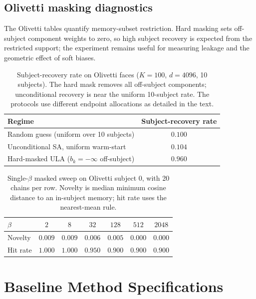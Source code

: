\subsection{Olivetti masking diagnostics}
The Olivetti tables quantify memory-subset restriction. Hard masking
sets off-subject component weights to zero, so high subject recovery is expected
from the restricted support; the experiment remains useful for measuring
leakage and the geometric effect of soft biases.
\begin{table}[ht]
\centering
\caption{Subject-recovery rate on Olivetti faces ($K=100$,
$d=4096$, 10 subjects). The hard mask removes all off-subject components;
unconditional recovery is near the uniform 10-subject rate. The protocols use
different endpoint allocations as detailed in the text.}
\label{tab:olivetti-recovery}
\small
\begin{tabular}{@{}lc@{}}
\toprule
Regime & Subject-recovery rate \\
\midrule
Random guess (uniform over 10 subjects) & $0.100$ \\
Unconditional SA, uniform warm-start    & $0.104$ \\
Hard-masked ULA ($b_{k}{=}-\infty$ off-subject) & $0.960$ \\
\bottomrule
\end{tabular}
\end{table}

\begin{table}[ht]
\centering
\caption{Single-$\beta$ masked sweep on Olivetti subject 0, with
20 chains per row. Novelty is median minimum cosine distance to an in-subject
memory; hit rate uses the nearest-mean rule.}
\label{tab:olivetti-betasweep}
\small
\begin{tabular}{@{}lcccccc@{}}
\toprule
$\beta$ & $2$ & $8$ & $32$ & $128$ & $512$ & $2048$ \\
\midrule
Novelty & $0.009$ & $0.009$ & $0.006$ & $0.005$ & $0.000$ & $0.000$ \\
Hit rate & $1.000$ & $1.000$ & $0.950$ & $0.900$ & $0.900$ & $0.900$ \\
\bottomrule
\end{tabular}
\end{table}

\section{Baseline Method Specifications}\label{app:baseline-methods}

